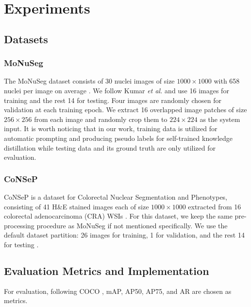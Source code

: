 \documentclass[journal,twoside,web]{ieeecolor}
\begin{document}
\section{Experiments}
\label{experiments}
\subsection{Datasets}
\subsubsection{MoNuSeg} %
The MoNuSeg dataset consists of 30 nuclei images of size $1000\times1000$ with 658 nuclei per image on average \cite{kumar2017dataset}. We follow Kumar \textit{et al.} \cite{kumar2017dataset} and use 16 images for training and the rest 14 for testing. Four images are randomly chosen for validation at each training epoch. We extract 16 overlapped image patches of size $256\times256$ from each image and randomly crop them to $224\times224$ as the system input. It is worth noticing that in our work, training data is utilized for automatic prompting and producing pseudo labels for self-trained knowledge distillation while testing data and its ground truth are only utilized for evaluation.
\subsubsection{CoNSeP}
CoNSeP is a dataset for Colorectal Nuclear Segmentation and Phenotypes, consisting of 41 H\&E stained images each of size $1000\times1000$ extracted from 16 colorectal adenocarcinoma (CRA) WSIs \cite{graham2019hover}. For this dataset, we keep the same pre-processing procedure as MoNuSeg if not mentioned specifically. We use the default dataset partition: 26 images for training, 1 for validation, and the rest 14 for testing \cite{graham2019hover}.

\subsection{Evaluation Metrics and Implementation}
For evaluation, following COCO \cite{lin2014microsoft}, mAP, AP50, AP75, and AR are chosen as metrics.
\end{document}
